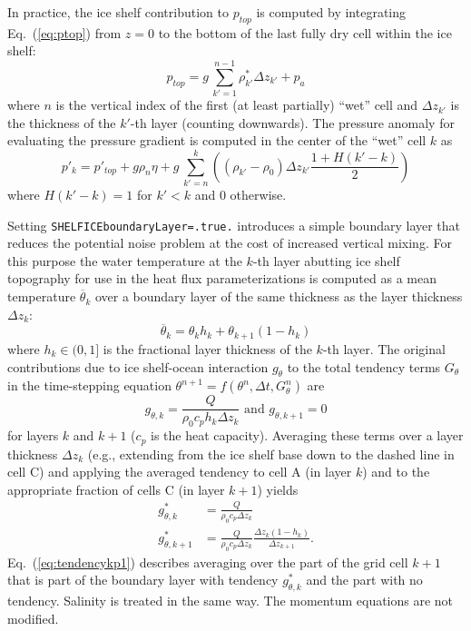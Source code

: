 In practice, the ice shelf contribution to $p_{top}$ is computed by
integrating Eq.~(\ref{eq:ptop}) from $z=0$ to the bottom of the last
fully dry cell within the ice shelf:
\begin{equation}
  \label{eq:surfacepressure}
  p_{top} = g\,\sum_{k'=1}^{n-1}\rho_{k'}^{*}\Delta{z_{k'}} + p_{a}
\end{equation}
where $n$ is the vertical index of the first (at least partially)
``wet'' cell and $\Delta{z_{k'}}$ is the thickness of the $k'$-th
layer (counting downwards). The pressure anomaly for evaluating the pressure
gradient is computed in the center of the ``wet'' cell $k$ as
\begin{equation}
  \label{eq:discretizedpressure}
  p'_{k} = p'_{top} + g\rho_{n}\eta +
  g\,\sum_{k'=n}^{k}\left((\rho_{k'}-\rho_{0})\Delta{z_{k'}} 
  \frac{1+H(k'-k)}{2}\right)
\end{equation}
where $H(k'-k)=1$ for $k'<k$ and $0$ otherwise.  

Setting \texttt{SHELFICEboundaryLayer=.true.} introduces a simple
boundary layer that reduces the potential noise problem at the cost of
increased vertical mixing. For this purpose the water temperature at
the $k$-th layer abutting ice shelf topography for use in the heat
flux parameterizations is computed as a mean temperature
$\overline{\theta}_{k}$ over a boundary layer of the same thickness as
the layer thickness $\Delta{z}_{k}$:
\begin{equation}
  \label{eq:thetabl}
  \overline{\theta}_{k} = \theta_{k} h_{k} + \theta_{k+1} (1-h_{k})
\end{equation}
where $h_{k}\in(0,1]$ is the fractional layer thickness of the $k$-th
layer. The original contributions due to ice shelf-ocean interaction
$g_{\theta}$ to the total tendency terms $G_{\theta}$ in the
time-stepping equation
$\theta^{n+1} = f(\theta^{n},\Delta{t},G_{\theta}^{n})$ 
%
are
\begin{equation}
  \label{eq:orgtendency}
  g_{\theta,k}   = \frac{Q}{\rho_{0} c_{p} h_{k} \Delta{z}_{k}}
  \text{ and } g_{\theta,k+1} = 0
\end{equation}
for layers $k$ and $k+1$ ($c_{p}$ is the heat capacity).  Averaging
these terms over a layer thickness $\Delta{z_{k}}$ (e.g., extending
from the ice shelf base down to the dashed line in cell C) and
applying the averaged tendency to cell A (in layer $k$) and to the
appropriate fraction of cells C (in layer $k+1$) yields
\begin{align}
  \label{eq:tendencyk}
  g_{\theta,k}^*   &= \frac{Q}{\rho_{0} c_{p} \Delta{z}_{k}} \\
  \label{eq:tendencykp1}
  g_{\theta,k+1}^*
  &= \frac{Q}{\rho_{0} c_{p} \Delta{z}_{k}} 
  \frac{ \Delta{z}_{k} ( 1- h_{k} )}{\Delta{z}_{k+1}}.
\end{align}
Eq.~(\ref{eq:tendencykp1}) describes averaging over the part of the
grid cell $k+1$ that is part of the boundary layer with tendency
$g_{\theta,k}^*$ and the part with no tendency. Salinity is treated in
the same way. The momentum equations are not modified. 

